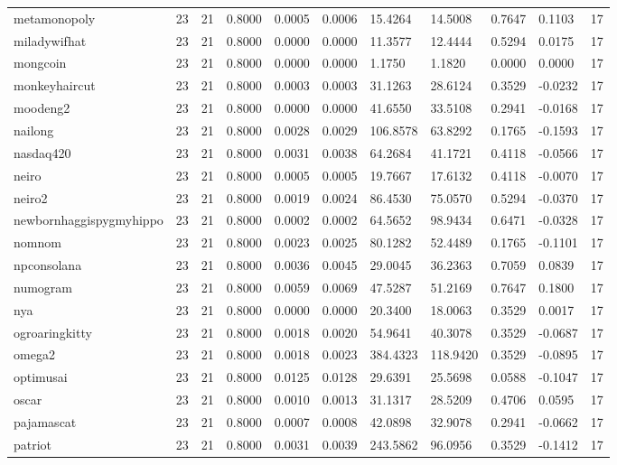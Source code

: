 \begin{table}[htbp]
\begin{tabular}{lllllllllll}
metamonopoly & 23 & 21 & 0.8000 & 0.0005 & 0.0006 & 15.4264 & 14.5008 & 0.7647 & 0.1103 & 17 \\
miladywifhat & 23 & 21 & 0.8000 & 0.0000 & 0.0000 & 11.3577 & 12.4444 & 0.5294 & 0.0175 & 17 \\
mongcoin & 23 & 21 & 0.8000 & 0.0000 & 0.0000 & 1.1750 & 1.1820 & 0.0000 & 0.0000 & 17 \\
monkeyhaircut & 23 & 21 & 0.8000 & 0.0003 & 0.0003 & 31.1263 & 28.6124 & 0.3529 & -0.0232 & 17 \\
moodeng2 & 23 & 21 & 0.8000 & 0.0000 & 0.0000 & 41.6550 & 33.5108 & 0.2941 & -0.0168 & 17 \\
nailong & 23 & 21 & 0.8000 & 0.0028 & 0.0029 & 106.8578 & 63.8292 & 0.1765 & -0.1593 & 17 \\
nasdaq420 & 23 & 21 & 0.8000 & 0.0031 & 0.0038 & 64.2684 & 41.1721 & 0.4118 & -0.0566 & 17 \\
neiro & 23 & 21 & 0.8000 & 0.0005 & 0.0005 & 19.7667 & 17.6132 & 0.4118 & -0.0070 & 17 \\
neiro2 & 23 & 21 & 0.8000 & 0.0019 & 0.0024 & 86.4530 & 75.0570 & 0.5294 & -0.0370 & 17 \\
newbornhaggispygmyhippo & 23 & 21 & 0.8000 & 0.0002 & 0.0002 & 64.5652 & 98.9434 & 0.6471 & -0.0328 & 17 \\
nomnom & 23 & 21 & 0.8000 & 0.0023 & 0.0025 & 80.1282 & 52.4489 & 0.1765 & -0.1101 & 17 \\
npconsolana & 23 & 21 & 0.8000 & 0.0036 & 0.0045 & 29.0045 & 36.2363 & 0.7059 & 0.0839 & 17 \\
numogram & 23 & 21 & 0.8000 & 0.0059 & 0.0069 & 47.5287 & 51.2169 & 0.7647 & 0.1800 & 17 \\
nya & 23 & 21 & 0.8000 & 0.0000 & 0.0000 & 20.3400 & 18.0063 & 0.3529 & 0.0017 & 17 \\
ogroaringkitty & 23 & 21 & 0.8000 & 0.0018 & 0.0020 & 54.9641 & 40.3078 & 0.3529 & -0.0687 & 17 \\
omega2 & 23 & 21 & 0.8000 & 0.0018 & 0.0023 & 384.4323 & 118.9420 & 0.3529 & -0.0895 & 17 \\
optimusai & 23 & 21 & 0.8000 & 0.0125 & 0.0128 & 29.6391 & 25.5698 & 0.0588 & -0.1047 & 17 \\
oscar & 23 & 21 & 0.8000 & 0.0010 & 0.0013 & 31.1317 & 28.5209 & 0.4706 & 0.0595 & 17 \\
pajamascat & 23 & 21 & 0.8000 & 0.0007 & 0.0008 & 42.0898 & 32.9078 & 0.2941 & -0.0662 & 17 \\
patriot & 23 & 21 & 0.8000 & 0.0031 & 0.0039 & 243.5862 & 96.0956 & 0.3529 & -0.1412 & 17 \\

\end{tabular}
\end{table}
